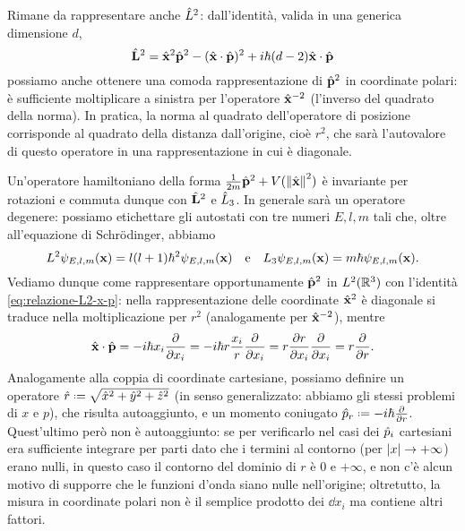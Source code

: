 Rimane da rappresentare anche $\hat{L}^2$: dall'identità, valida in una generica dimensione $d$,
\begin{equation}
	\hat{\mathbf{L}}^2=\hat{\mathbf{x}}^2\hat{\mathbf{p}}^2-({\hat{\mathbf{x}}}\cdot{\hat{\mathbf{p}}})^2+i\hbar(d-2){\hat{\mathbf{x}}}\cdot{\hat{\mathbf{p}}}
	\label{eq:relazione-L2-x-p}
\end{equation}
possiamo anche ottenere una comoda rappresentazione di $\hat{\mathbf{p}}^2$ in coordinate polari: è sufficiente moltiplicare a sinistra per l'operatore $\hat{\mathbf{x}}^{-2}$ (l'inverso del quadrato della norma).
In pratica, la norma al quadrato dell'operatore di posizione corrisponde al quadrato della distanza dall'origine, cioè $r^2$, che sarà l'autovalore di questo operatore in una rappresentazione in cui è diagonale.

Un'operatore hamiltoniano della forma $\frac1{2m}\hat{\mathbf{p}}^2+V(\left\|{\hat{\mathbf{x}}}\right\|^2)$ è invariante per rotazioni e commuta dunque con $\hat{\mathbf{L}}^2$ e $\hat{L}_3$.
In generale sarà un operatore degenere: possiamo etichettare gli autostati con tre numeri $E,l,m$ tali che, oltre all'equazione di Schr\"odinger, abbiamo
\begin{equation}
	L^2\psi_{E,l,m}(\mathbf{x})=l(l+1)\hbar^2\psi_{E,l,m}(\mathbf{x})\quad\text{e}\quad L_3\psi_{E,l,m}(\mathbf{x})=m\hbar\psi_{E,l,m}(\mathbf{x}).
\end{equation}
Vediamo dunque come rappresentare opportunamente $\hat{\mathbf{p}}^2$ in $L^2(\mathbb{R}^3)$ con l'identità \eqref{eq:relazione-L2-x-p}: nella rappresentazione delle coordinate $\hat{\mathbf{x}}^2$ è diagonale si traduce nella moltiplicazione per $r^2$ (analogamente per $\hat{\mathbf{x}}^{-2}$), mentre
\begin{equation}
	{\hat{\mathbf{x}}}\cdot{\hat{\mathbf{p}}}=-i\hbar x_i\frac{\partial {}}{\partial {x_i}}=-i\hbar r\frac{x_i}{r}\frac{\partial {}}{\partial {x_i}}=r\frac{\partial {r}}{\partial {x_i}}\frac{\partial {}}{\partial {x_i}}=r\frac{\partial {}}{\partial {r}}.
\end{equation}
Analogamente alla coppia di coordinate cartesiane, possiamo definire un operatore $\op r\defeq\sqrt{\op x^2+\op y^2+\op z^2}$ (in senso generalizzato: abbiamo gli stessi problemi di $x$ e $p$), che risulta autoaggiunto, e un momento coniugato $\op p_r\defeq-i\hbar\drp{}{r}$.
Quest'ultimo però non è autoaggiunto: se per verificarlo nel casi dei $\hat{p}_i$ cartesiani era sufficiente integrare per parti dato che i termini al contorno (per $\left|{x}\right|\to+\infty$) erano nulli, in questo caso il contorno del dominio di $r$ è $0$ e $+\infty$, e non c'è alcun motivo di supporre che le funzioni d'onda siano nulle nell'origine; oltretutto, la misura in coordinate polari non è il semplice prodotto dei $\dd x_i$ ma contiene altri fattori.
